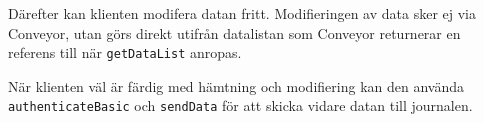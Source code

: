 \documentclass[techdoc/techdoc.tex]{subfiles}
\begin{document}
Därefter kan klienten modifera datan fritt. Modifieringen av data sker ej via
Conveyor, utan görs direkt utifrån datalistan som Conveyor returnerar en
referens till när \texttt{getDataList} anropas.

När klienten väl är färdig med hämtning och modifiering kan den använda
\texttt{authenticateBasic} och \texttt{sendData} för att skicka vidare datan
till journalen.
\end{document}
